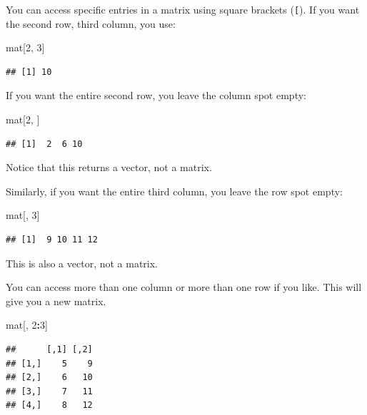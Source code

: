 \documentclass[
]{article}
\newenvironment{Shaded}{\begin{snugshade}}{\end{snugshade}}
\newcommand{\DecValTok}[1]{\textcolor[rgb]{0.00,0.00,0.81}{#1}}
\newcommand{\NormalTok}[1]{#1}
\newcommand{\SpecialCharTok}[1]{\textcolor[rgb]{0.81,0.36,0.00}{\textbf{#1}}}
\begin{document}
You can access specific entries in a matrix using square brackets
(\texttt{{[}}). If you want the second row, third column, you use:

\begin{Shaded}
\begin{Highlighting}[]
\NormalTok{mat[}\DecValTok{2}\NormalTok{, }\DecValTok{3}\NormalTok{]}
\end{Highlighting}
\end{Shaded}

\begin{verbatim}
## [1] 10
\end{verbatim}

If you want the entire second row, you leave the column spot empty:

\begin{Shaded}
\begin{Highlighting}[]
\NormalTok{mat[}\DecValTok{2}\NormalTok{, ]}
\end{Highlighting}
\end{Shaded}

\begin{verbatim}
## [1]  2  6 10
\end{verbatim}

Notice that this returns a vector, not a matrix.

Similarly, if you want the entire third column, you leave the row spot
empty:

\begin{Shaded}
\begin{Highlighting}[]
\NormalTok{mat[, }\DecValTok{3}\NormalTok{]}
\end{Highlighting}
\end{Shaded}

\begin{verbatim}
## [1]  9 10 11 12
\end{verbatim}

This is also a vector, not a matrix.

You can access more than one column or more than one row if you like.
This will give you a new matrix.

\begin{Shaded}
\begin{Highlighting}[]
\NormalTok{mat[, }\DecValTok{2}\SpecialCharTok{:}\DecValTok{3}\NormalTok{]}
\end{Highlighting}
\end{Shaded}

\begin{verbatim}
##      [,1] [,2]
## [1,]    5    9
## [2,]    6   10
## [3,]    7   11
## [4,]    8   12
\end{verbatim}
\end{document}

